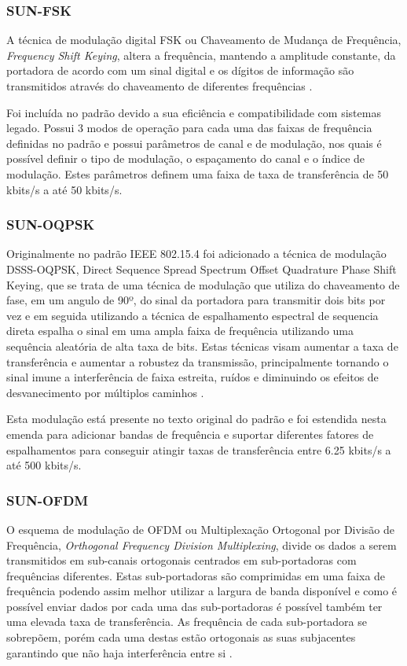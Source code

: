 \subsubsection*{SUN-FSK}
A técnica de modulação digital FSK ou Chaveamento de Mudança de Frequência, \emph{Frequency Shift Keying}, altera a frequência, mantendo a amplitude constante, da portadora de acordo com um sinal digital e os dígitos de informação são transmitidos através do chaveamento de diferentes frequências \cite{lathi2012}.

Foi incluída no padrão devido a sua eficiência e compatibilidade com sistemas legado. Possui 3 modos de operação para cada uma das faixas de frequência definidas no padrão e possui parâmetros de canal e de modulação, nos quais é possível definir o tipo de modulação, o espaçamento do canal e o índice de modulação. Estes parâmetros definem uma faixa de taxa de transferência de 50 kbits/s a até 50 kbits/s.

\subsubsection*{SUN-OQPSK}
Originalmente no padrão IEEE 802.15.4 foi adicionado a técnica de modulação DSSS-OQPSK, Direct Sequence Spread Spectrum Offset Quadrature Phase Shift Keying, que se trata de uma técnica de modulação que utiliza do chaveamento de fase, em um angulo de 90º, do sinal da portadora para transmitir dois bits por vez e em seguida utilizando a técnica de espalhamento espectral de sequencia direta espalha o sinal em uma ampla faixa de frequência utilizando uma sequência aleatória de alta taxa de bits. Estas técnicas visam aumentar a taxa de transferência e aumentar a robustez da transmissão, principalmente tornando o sinal imune a interferência de faixa estreita, ruídos e diminuindo os efeitos de desvanecimento por múltiplos caminhos \cite{goldsmith2005wireless}.

Esta modulação está presente no texto original do padrão e foi estendida nesta emenda para adicionar bandas de frequência e suportar diferentes fatores de espalhamentos para conseguir atingir taxas de transferência entre 6.25 kbits/s a até 500 kbits/s.

\subsubsection*{SUN-OFDM}
O esquema de modulação de OFDM ou Multiplexação Ortogonal por Divisão de Frequência, \emph{Orthogonal Frequency Division Multiplexing}, divide os dados a serem transmitidos em sub-canais ortogonais centrados em  sub-portadoras com frequências diferentes. Estas sub-portadoras são comprimidas em uma faixa de frequência podendo assim melhor utilizar a largura de banda disponível e como é possível enviar dados por cada uma das sub-portadoras é possível também ter uma elevada taxa de transferência. As frequência de cada sub-portadora se sobrepõem, porém cada uma destas estão ortogonais as suas subjacentes garantindo que não haja interferência entre si \cite{rappaport2009}\cite{goldsmith2005wireless}.

